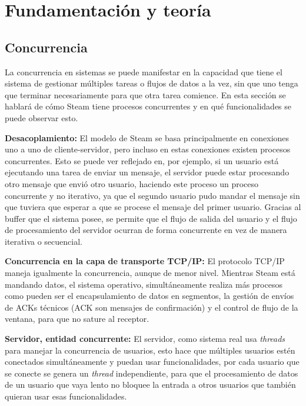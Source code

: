 \chapter{Fundamentación y teoría}
\label{sec:Fundamentacion}

\section{Concurrencia}

La concurrencia en sistemas se puede manifestar en la capacidad que tiene el sistema de gestionar múltiples tareas o flujos de datos a la vez, sin que uno tenga que terminar necesariamente para que otra tarea comience. En esta sección se hablará de cómo Steam tiene procesos concurrentes y en qué funcionalidades se puede observar esto.

\textbf{Desacoplamiento: } El modelo de Steam se basa principalmente en conexiones uno a uno de cliente-servidor, pero incluso en estas conexiones existen procesos concurrentes. Esto se puede ver reflejado en, por ejemplo, si un usuario está ejecutando una tarea de enviar un mensaje, el servidor puede estar procesando otro mensaje que envió otro usuario, haciendo este proceso un proceso concurrente y no iterativo, ya que el segundo usuario pudo mandar el mensaje sin que tuviera que esperar a que se procese el mensaje del primer usuario. Gracias al buffer que el sistema posee, se permite que el flujo de salida del usuario y el flujo de procesamiento del servidor ocurran de forma concurrente en vez de manera iterativa o secuencial.

\textbf{Concurrencia en la capa de transporte TCP/IP: } El protocolo TCP/IP maneja igualmente la concurrencia, aunque de menor nivel. Mientras Steam está mandando datos, el sistema operativo, simultáneamente realiza más procesos como pueden ser el encapsulamiento de datos en segmentos, la gestión de envíos de ACKs técnicos (ACK son mensajes de confirmación) y el control de flujo de la ventana, para que no sature al receptor.

\textbf{Servidor, entidad concurrente: } El servidor, como sistema real usa \textit{threads} para manejar la concurrencia de usuarios, esto hace que múltiples usuarios estén conectados simultáneamente y puedan usar funcionalidades, por cada usuario que se conecte se genera un \textit{thread} independiente, para que el procesamiento de datos de un usuario que vaya lento no bloquee la entrada a otros usuarios que también quieran usar esas funcionalidades.

